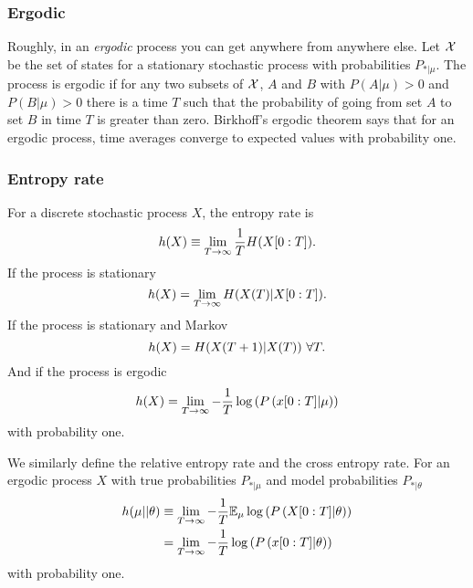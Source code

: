 \subsubsection{Ergodic}
Roughly, in an \emph{ergodic}  process you can
get anywhere from anywhere else.  Let ${\cal X}$ be the set of states
for a stationary stochastic process with probabilities $P_{*|\mu}$.
The process is ergodic if for any two subsets of ${\cal X}$, $A$ and
$B$ with $P(A|\mu) > 0$ and $P(B|\mu) > 0$ there is a time $T$ such
that the probability of going from set $A$ to set $B$ in time $T$ is
greater than zero.  Birkhoff's ergodic theorem says that for an
ergodic process, time averages converge to expected values with
probability one.

\subsubsection{Entropy rate}
For a discrete stochastic process $X$, the entropy rate  is 
\begin{equation}
  \label{eq:hrate1}
  h(X) \equiv \lim_{T \rightarrow \infty} \frac{1}{T} H(X[0:T]).
\end{equation}
If the process is stationary
\begin{equation}
  \label{eq:hrate2}
  h(X) = \lim_{T \rightarrow \infty} H({X}{(T)}|X[0:T]).
\end{equation}
If the process is stationary and Markov
\begin{equation}
  \label{eq:hrate3}
  h(X) =  H({X}{(T+1)}|{X}{(T)})~\forall T.
\end{equation}
And if the process is ergodic
\begin{equation}
  \label{eq:hrate4}
  h(X) = \lim_{T \rightarrow \infty} - \frac{1}{T} \log \left( P \left(x[0:T]|\mu \right) \right)
\end{equation}
with probability one.

We similarly define the relative entropy rate and the cross entropy
rate.  For an ergodic process $X$ with true probabilities $P_{*|\mu}$ and
model probabilities $P_{*|\theta}$
\begin{align}
  \label{eq:hrate5}
  h(\mu||\theta) &\equiv  \lim_{T \rightarrow \infty} - \frac{1}{T}
  \mathbb{E}_\mu \log \left( P \left(X[0:T]|\theta \right) \right) \\
  &=  \lim_{T \rightarrow \infty} - \frac{1}{T} \log \left( P
  \left(x[0:T]| \theta \right) \right) \nonumber
\end{align}
with probability one.

